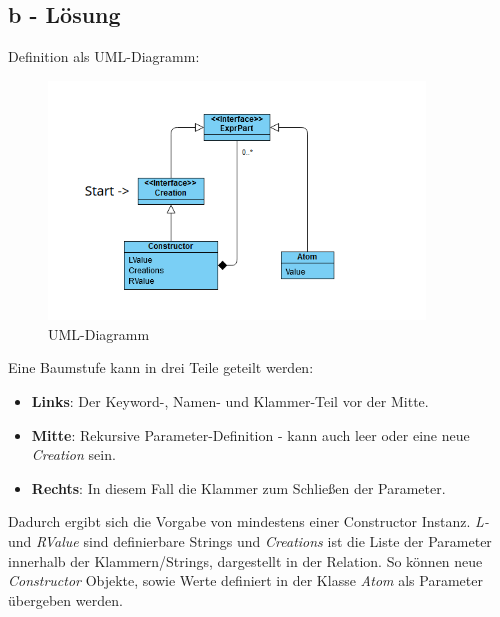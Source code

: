 \subsection*{b - Lösung}
Definition als UML-Diagramm:
\begin{figure}[h]
    \centering
    \includegraphics[width=10cm]{images/Aufgabe2b_Diagramm}
    \caption{UML-Diagramm}
    \label{fig:Aufgabe2b_UML}
\end{figure}
\newline
Eine Baumstufe kann in drei Teile geteilt werden:
\begin{itemize}
    \item \textbf{Links}: Der Keyword-, Namen- und Klammer-Teil vor der Mitte.
    \item \textbf{Mitte}: Rekursive Parameter-Definition - kann auch leer oder eine neue \textit{Creation} sein.
    \item \textbf{Rechts}: In diesem Fall die Klammer zum Schließen der Parameter.
\end{itemize}
\newline
Dadurch ergibt sich die Vorgabe von mindestens einer Constructor Instanz.
\textit{L-} und \textit{RValue} sind definierbare Strings und \textit{Creations}
ist die Liste der Parameter innerhalb der Klammern/Strings, dargestellt in der Relation.
So können neue \textit{Constructor} Objekte, sowie Werte definiert in der Klasse \textit{Atom} als Parameter übergeben werden.

